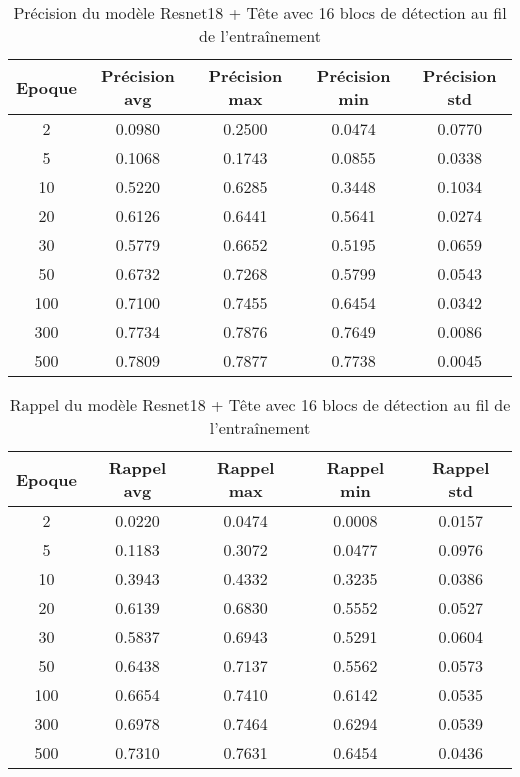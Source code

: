 \begin{table}[!ht]
    \caption{Précision du modèle Resnet18 + Tête avec 16 blocs de détection au fil de l'entraînement}
    \label{tab:resnet18+head_16n_precision}
    \centering
    \begin{tabular}{ |c||c|c|c|c|  }
        \hline
        \rowcolor{gray!50}
        Epoque & Précision avg & Précision max & Précision min & Précision std\\
        \hline
        2 & 0.0980 & 0.2500 & 0.0474 & 0.0770\\
        5 & 0.1068 & 0.1743 & 0.0855 & 0.0338\\
        10 & 0.5220 & 0.6285 & 0.3448 & 0.1034\\
        20 & 0.6126 & 0.6441 & 0.5641 & 0.0274\\
        30 & 0.5779 & 0.6652 & 0.5195 & 0.0659\\
        50 & 0.6732 & 0.7268 & 0.5799 & 0.0543\\
        100 & 0.7100 & 0.7455 & 0.6454 & 0.0342\\
        300 & 0.7734 & 0.7876 & 0.7649 & 0.0086\\
        500 & 0.7809 & 0.7877 & 0.7738 & 0.0045\\
        \hline
    \end{tabular}
\end{table}

\begin{table}[!ht]
    \caption{Rappel du modèle Resnet18 + Tête avec 16 blocs de détection au fil de l'entraînement}
    \label{tab:resnet18+head_16n_rappel}
    \centering
    \begin{tabular}{ |c||c|c|c|c|  }
        \hline
        \rowcolor{gray!50}
        Epoque & Rappel avg & Rappel max & Rappel min & Rappel std\\
        \hline
        2 & 0.0220 & 0.0474 & 0.0008 & 0.0157\\
        5 & 0.1183 & 0.3072 & 0.0477 & 0.0976\\
        10 & 0.3943 & 0.4332 & 0.3235 & 0.0386\\
        20 & 0.6139 & 0.6830 & 0.5552 & 0.0527\\
        30 & 0.5837 & 0.6943 & 0.5291 & 0.0604\\
        50 & 0.6438 & 0.7137 & 0.5562 & 0.0573\\
        100 & 0.6654 & 0.7410 & 0.6142 & 0.0535\\
        300 & 0.6978 & 0.7464 & 0.6294 & 0.0539\\
        500 & 0.7310 & 0.7631 & 0.6454 & 0.0436\\
        \hline
    \end{tabular}
\end{table}


